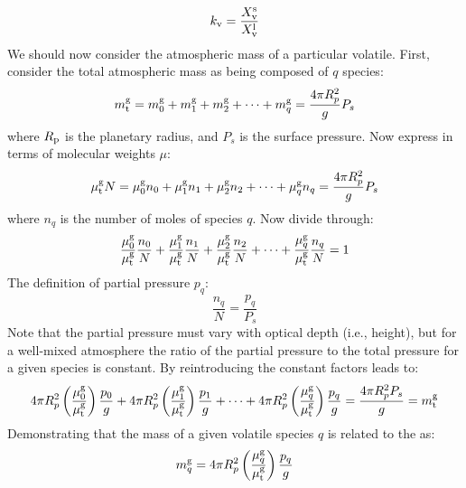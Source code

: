 \begin{equation}
k_{\rm v} = \frac{X_{\rm v}^{\rm s}}{X_{\rm v}^{\rm l}}
\end{equation}
We should now consider the  atmospheric mass of a particular volatile.  First, consider the total atmospheric mass as being composed of $q$ species:
\begin{equation}
m_{\rm t}^{\rm g} = m_0^{\rm g} + m_1^{\rm g} + m_2^{\rm g} + \dots + m_q^{\rm g} = \frac{4 \pi R_p^2}{g} P_s
\end{equation}
where $R_{\rm p}$ is the planetary radius, and $P_s$ is the surface pressure.  Now express in terms of molecular weights $\mu$:
\begin{equation}
\mu_{\rm t}^{\rm g} N = \mu_0^{\rm g} n_0 + \mu_1^{\rm g} n_1 + \mu_2^{\rm g} n_2+ \dots + \mu_q^{\rm g} n_q = \frac{4 \pi R_p^2}{g} P_s
\end{equation}
where $n_q$ is the number of moles of species $q$.  Now divide through:
\begin{equation}
\frac{\mu_0^{\rm g}}{\mu_{\rm t}^{\rm g}} \frac{n_0}{N} + \frac{\mu_1^{\rm g}}{\mu_{\rm t}^{\rm g}} \frac{n_1}{N} + \frac{\mu_2^{\rm g}}{\mu_{\rm t}^{\rm g}} \frac{n_2}{N}+ \dots + \frac{\mu_q^{\rm g}}{\mu_{\rm t}^{\rm g}} \frac{n_q}{N} = 1
\end{equation}
The definition of partial pressure $p_q$:
\begin{equation}
\frac{n_q}{N} = \frac{p_q}{P_s}
\end{equation}
Note that the partial pressure must vary with optical depth (i.e., height), but for a well-mixed atmosphere the ratio of the partial pressure to the total pressure for a given species is constant.  By reintroducing the constant factors leads to:
\begin{equation}
4 \pi R_p^2 \left( \frac{\mu_0^{\rm g}}{\mu_{\rm t}^{\rm g}} \right) \frac{p_0}{g} + 4 \pi R_p^2 \left( \frac{\mu_1^{\rm g}}{\mu_{\rm t}^{\rm g}} \right) \frac{p_1}{g} + \dots + 4 \pi R_p^2 \left( \frac{\mu_q^{\rm g}}{\mu_{\rm t}^{\rm g}} \right) \frac{p_q}{g} = \frac{4 \pi R_p^2 P_s}{g} = m_{\rm t}^{\rm g}
\end{equation}
Demonstrating that the mass of a given volatile species $q$ is related to the  as:
\begin{equation}
m_q^{\rm g} = 4 \pi R_p^2 \left( \frac{\mu_q^{\rm g}}{\mu_{\rm t}^{\rm g}} \right) \frac{p_q}{g}
\end{equation}
